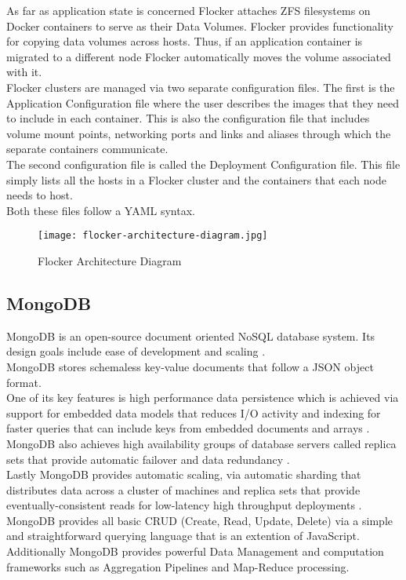 \documentclass{article}
\begin{document}
As far as application state is concerned Flocker attaches ZFS filesystems on Docker containers to serve as their Data Volumes. Flocker provides functionality for copying data volumes across hosts. Thus, if an application container is migrated to a different node Flocker automatically moves the volume associated with it\cite{flocker-docks}.\\
Flocker clusters are managed via two separate configuration files. The first is the Application Configuration file where the user describes the images that they need to include in each container. This is also the configuration file that includes volume mount points, networking ports and links and aliases through which the separate containers communicate\cite{flocker-docks}.\\
The second configuration file is called the Deployment Configuration file. This file simply lists all the hosts in a Flocker cluster and the containers that each node needs to host\cite{flocker-docks}.\\
Both these files follow a YAML syntax\cite{flocker-docks}.

\begin{center}
    \begin{figure}[h!]
    \centering
    \texttt{[image: flocker-architecture-diagram.jpg]}
    \caption{Flocker Architecture Diagram}
    \end{figure}
\end{center}

\subsection{MongoDB}
MongoDB is an open-source document oriented NoSQL database system. Its design goals include ease of development and scaling \cite{mongodb-docs}.\\
MongoDB stores schemaless key-value documents that follow a JSON object format.\\
One of its key features is high performance data persistence which is achieved via support for embedded data models that reduces I/O activity and indexing for faster queries that can include keys from embedded documents and arrays \cite{mongodb-intro}.\\
MongoDB also achieves high availability groups of database servers called replica sets that provide automatic failover and data redundancy \cite{mongodb-intro}.\\
Lastly MongoDB provides automatic scaling, via automatic sharding that distributes data across a cluster of machines and replica sets that provide eventually-consistent reads for low-latency high throughput deployments \cite{mongodb-intro}.\\
MongoDB provides all basic CRUD (Create, Read, Update, Delete) via a simple and straightforward querying language that is an extention of JavaScript\cite{mongodb-crud}.\\
Additionally MongoDB provides powerful Data Management and computation frameworks such as Aggregation Pipelines and Map-Reduce processing\cite{mongodb-aggregation}.
\end{document}
